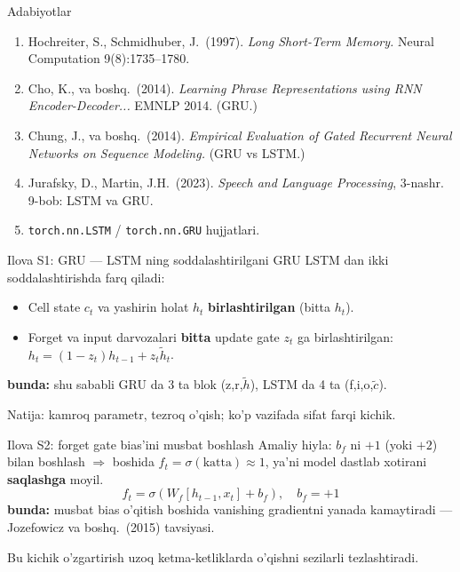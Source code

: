 \documentclass[aspectratio=169,11pt]{beamer}
\newcommand{\bunda}[1]{{\small\textbf{bunda:}\; #1}}
\begin{document}
\begin{frame}{Adabiyotlar}
  \begin{enumerate}\small\setlength\itemsep{5pt}
    \item Hochreiter, S., Schmidhuber, J.\ (1997). \textit{Long Short-Term Memory.}
          Neural Computation 9(8):1735--1780.
    \item Cho, K., va boshq.\ (2014). \textit{Learning Phrase Representations using
          RNN Encoder-Decoder...} EMNLP 2014. (GRU.)
    \item Chung, J., va boshq.\ (2014). \textit{Empirical Evaluation of Gated
          Recurrent Neural Networks on Sequence Modeling.} (GRU vs LSTM.)
    \item Jurafsky, D., Martin, J.H.\ (2023). \textit{Speech and Language
          Processing}, 3-nashr. 9-bob: LSTM va GRU.
    \item \texttt{torch.nn.LSTM} / \texttt{torch.nn.GRU} hujjatlari.
  \end{enumerate}
\end{frame}

\appendix

\begin{frame}{Ilova S1: GRU --- LSTM ning soddalashtirilgani}
  \small
  GRU LSTM dan ikki soddalashtirishda farq qiladi:
  \begin{itemize}\setlength\itemsep{2pt}
    \item Cell state $c_t$ va yashirin holat $h_t$ \textbf{birlashtirilgan} (bitta $h_t$).
    \item Forget va input darvozalari \textbf{bitta} update gate $z_t$ ga birlashtirilgan:
          $h_t=(1-z_t)h_{t-1}+z_t\tilde{h}_t$.
  \end{itemize}
  \bunda{shu sababli GRU da 3 ta blok (z,r,$\tilde{h}$), LSTM da 4 ta (f,i,o,$\tilde{c}$).}
  \vspace{4pt}

  Natija: kamroq parametr, tezroq o'qish; ko'p vazifada sifat farqi kichik.
\end{frame}

\begin{frame}{Ilova S2: forget gate bias'ini musbat boshlash}
  \small
  Amaliy hiyla: $b_f$ ni $+1$ (yoki $+2$) bilan boshlash $\Rightarrow$ boshida
  $f_t=\sigma(\text{katta})\approx 1$, ya'ni model dastlab xotirani \textbf{saqlashga}
  moyil.
  $$ f_t = \sigma(W_f[h_{t-1},x_t] + b_f), \quad b_f = +1 $$
  \bunda{musbat bias o'qitish boshida vanishing gradientni yanada kamaytiradi ---
  Jozefowicz va boshq.\ (2015) tavsiyasi.}
  \vspace{4pt}

  Bu kichik o'zgartirish uzoq ketma-ketliklarda o'qishni sezilarli tezlashtiradi.
\end{frame}
\end{document}
